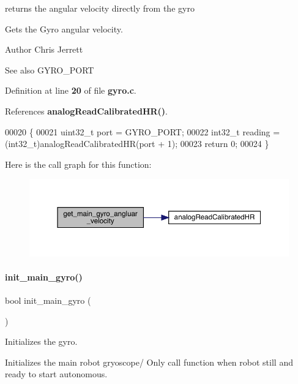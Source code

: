 returns the angular velocity directly from the gyro 

Gets the Gyro angular velocity.

\begin{DoxyAuthor}{Author}
Chris Jerrett 
\end{DoxyAuthor}
\begin{DoxySeeAlso}{See also}
G\+Y\+R\+O\+\_\+\+P\+O\+RT 
\end{DoxySeeAlso}


Definition at line \textbf{ 20} of file \textbf{ gyro.\+c}.



References \textbf{ analog\+Read\+Calibrated\+H\+R()}.


\begin{DoxyCode}
00020                                        \{
00021   uint32\_t port = GYRO\_PORT;
00022   int32\_t reading = (int32\_t)analogReadCalibratedHR(port + 1);
00023   \textcolor{keywordflow}{return} 0;
00024 \}
\end{DoxyCode}
Here is the call graph for this function\+:
\nopagebreak
\begin{figure}[H]
\begin{center}
\leavevmode
\includegraphics[width=350pt]{gyro_8c_aec0963ebe3eb6cdfd7edaf486bbb0a87_cgraph}
\end{center}
\end{figure}
\mbox{\label{gyro_8c_a47c0a78a867be91a28e278bf433d699c}} 
\paragraph{init\+\_\+main\+\_\+gyro()}
{\footnotesize\ttfamily bool init\+\_\+main\+\_\+gyro (\begin{DoxyParamCaption}{ }\end{DoxyParamCaption})}



Initializes the gyro. 

Initializes the main robot gryoscope/ Only call function when robot still and ready to start autonomous.

